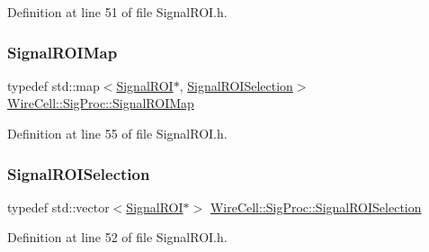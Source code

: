 Definition at line 51 of file Signal\+R\+O\+I.\+h.

\mbox{\label{namespace_wire_cell_1_1_sig_proc_afe3c3ad3e8b38c07bd7d999946b9440c}} 
\subsubsection{\texorpdfstring{Signal\+R\+O\+I\+Map}{SignalROIMap}}
{\footnotesize\ttfamily typedef std\+::map$<$\hyperlink{class_wire_cell_1_1_sig_proc_1_1_signal_r_o_i}{Signal\+R\+OI}$\ast$, \hyperlink{namespace_wire_cell_1_1_sig_proc_a00d799ccd19bfd30953903f24d36c2a4}{Signal\+R\+O\+I\+Selection}$>$ \hyperlink{namespace_wire_cell_1_1_sig_proc_afe3c3ad3e8b38c07bd7d999946b9440c}{Wire\+Cell\+::\+Sig\+Proc\+::\+Signal\+R\+O\+I\+Map}}



Definition at line 55 of file Signal\+R\+O\+I.\+h.

\mbox{\label{namespace_wire_cell_1_1_sig_proc_a00d799ccd19bfd30953903f24d36c2a4}} 
\subsubsection{\texorpdfstring{Signal\+R\+O\+I\+Selection}{SignalROISelection}}
{\footnotesize\ttfamily typedef std\+::vector$<$\hyperlink{class_wire_cell_1_1_sig_proc_1_1_signal_r_o_i}{Signal\+R\+OI}$\ast$$>$ \hyperlink{namespace_wire_cell_1_1_sig_proc_a00d799ccd19bfd30953903f24d36c2a4}{Wire\+Cell\+::\+Sig\+Proc\+::\+Signal\+R\+O\+I\+Selection}}



Definition at line 52 of file Signal\+R\+O\+I.\+h.

